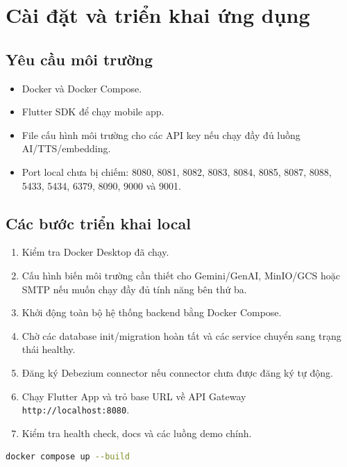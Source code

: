 \documentclass[14pt,a4paper,oneside]{extreport}
\begin{document}
\section{Cài đặt và triển khai ứng dụng}
\label{sec:cai-dat-trien-khai}

\subsection{Yêu cầu môi trường}

\begin{itemize}[leftmargin=2cm]
  \item Docker và Docker Compose.
  \item Flutter SDK để chạy mobile app.
  \item File cấu hình môi trường cho các API key nếu chạy đầy đủ luồng AI/TTS/embedding.
  \item Port local chưa bị chiếm: 8080, 8081, 8082, 8083, 8084, 8085, 8087, 8088, 5433, 5434, 6379, 8090, 9000 và 9001.
\end{itemize}

\subsection{Các bước triển khai local}

\begin{enumerate}[leftmargin=2cm]
  \item Kiểm tra Docker Desktop đã chạy.
  \item Cấu hình biến môi trường cần thiết cho Gemini/GenAI, MinIO/GCS hoặc SMTP nếu muốn chạy đầy đủ tính năng bên thứ ba.
  \item Khởi động toàn bộ hệ thống backend bằng Docker Compose.
  \item Chờ các database init/migration hoàn tất và các service chuyển sang trạng thái healthy.
  \item Đăng ký Debezium connector nếu connector chưa được đăng ký tự động.
  \item Chạy Flutter App và trỏ base URL về API Gateway \texttt{http://localhost:8080}.
  \item Kiểm tra health check, docs và các luồng demo chính.
\end{enumerate}

\begin{lstlisting}[language=bash,caption={Lệnh chạy hệ thống local},label={lst:docker-compose-up}]
docker compose up --build
\end{lstlisting}
\end{document}
